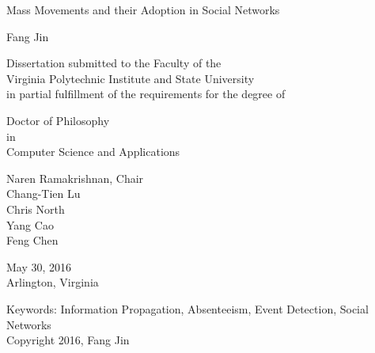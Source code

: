 \documentclass[12pt,dvips]{report}
\begin{document}
\thispagestyle{empty}
\begin{center}

{\Large
Mass Movements and their Adoption in Social Networks
}


\vfill

Fang Jin

\vfill

Dissertation submitted to the Faculty of the \\
Virginia Polytechnic Institute and State University \\
in partial fulfillment of the requirements for the degree of

\vfill

Doctor of Philosophy \\
in \\
Computer Science and Applications

\vfill

Naren Ramakrishnan, Chair \\
Chang-Tien Lu \\
Chris North \\
Yang Cao \\
Feng Chen

\vfill

May 30, 2016 \\
Arlington, Virginia

\vfill

Keywords: Information Propagation, Absenteeism, Event Detection, Social Networks
\\
Copyright 2016, Fang Jin

\end{center}

\pagebreak
\end{document}
